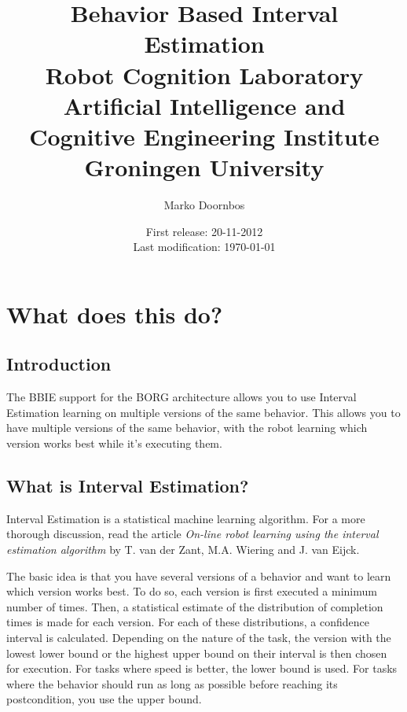 \documentclass[a4paper, 12pt, oneside]{report}
\newcommand{\titleVariable}{Behavior Based Interval Estimation}
\newcommand{\authorVariable}{Marko Doornbos}
\newcommand{\firstRelease}{20-11-2012}
\begin{document}
\title{\titleVariable \\ \small{Robot Cognition Laboratory \\ Artificial Intelligence and Cognitive Engineering Institute \\ Groningen University}}
\author{\authorVariable}
\date{\centering First release: \firstRelease \\ Last modification: \today}

\maketitle

\tableofcontents


\chapter{What does this do?}

\section{Introduction}

The BBIE support for the BORG architecture allows you to use Interval Estimation learning on multiple versions of the same behavior.
This allows you to have multiple versions of the same behavior, with the robot learning which version works best while it's executing them.

\section{What is Interval Estimation?}

Interval Estimation is a statistical machine learning algorithm.
For a more thorough discussion, read the article \emph{On-line robot learning using the interval estimation algorithm} by T. van der Zant, M.A. Wiering and J. van Eijck.

The basic idea is that you have several versions of a behavior and want to learn which version works best.
To do so, each version is first executed a minimum number of times.
Then, a statistical estimate of the distribution of completion times is made for each version.
For each of these distributions, a confidence interval is calculated.
Depending on the nature of the task, the version with the lowest lower bound or the highest upper bound on their interval is then chosen for execution.
For tasks where speed is better, the lower bound is used.
For tasks where the behavior should run as long as possible before reaching its postcondition, you use the upper bound.
\end{document}
